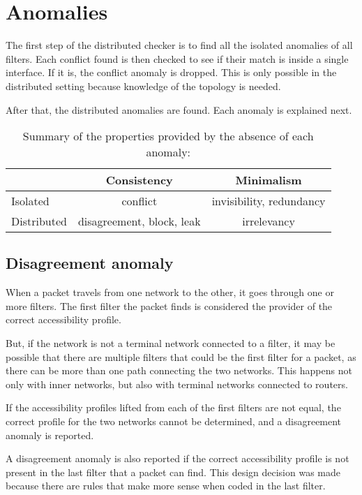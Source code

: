 \section{Anomalies}

The first step of the distributed checker is to find all the isolated anomalies of
all filters. Each conflict found is then checked to see if their match is
inside a single interface. If it is, the conflict anomaly is dropped. This is
only possible in the distributed setting because knowledge of the topology is
needed.

After that, the distributed anomalies are found. Each anomaly is explained next.

\begin{table}
	\centering
	\caption{Summary of the properties provided by the absence of each anomaly:}
	\begin{tabular}{l|cc}
		& Consistency  & Minimalism \\
		\hline
		Isolated     & conflict                  & invisibility, redundancy \\
		Distributed  & disagreement, block, leak & irrelevancy \\
	\end{tabular}
\end{table}

\subsection{Disagreement anomaly}

When a packet travels from one network to the other, it goes through one or more
filters. The first filter the packet finds is considered the provider of the
correct accessibility profile.

But, if the network is not a terminal network connected to a filter, it may be
possible that there are multiple filters that could be the first filter for a
packet, as there can be more than one path connecting the two networks. This
happens not only with inner networks, but also with terminal networks connected to
routers.

If the accessibility profiles lifted from each of the first filters are not
equal, the correct profile for the two networks cannot be determined, and a
disagreement anomaly is reported.

A disagreement anomaly is also reported if the correct accessibility profile is
not present in the last filter that a packet can find. This design decision was made
because there are rules that make more sense when coded in the last filter.

